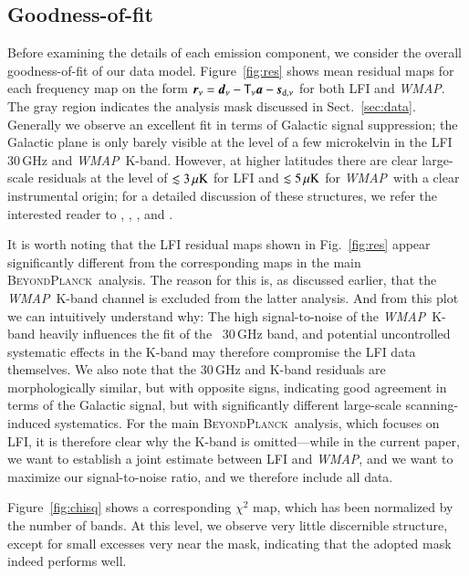\documentclass[twocolumn]{aa}
\def\WMAP{\textit{WMAP}}
\renewcommand{\d}[0]{\vec{d}}
\newcommand{\s}[0]{\vec{s}}
\renewcommand{\a}[0]{\vec{a}}
\newcommand{\T}[0]{\tens{T}}
\renewcommand{\r}[0]{\vec{r}}
\newcommand{\BP}{\textsc{BeyondPlanck}}
\begin{document}
\subsection{Goodness-of-fit}\label{subsub:goodness}



Before examining the details of each emission component, we consider
the overall goodness-of-fit of our data model. Figure~\ref{fig:res}
shows mean residual maps for each frequency map on the form $\r_{\nu}
= \d_{\nu} - \T_{\nu}\a - \s_{\mathrm{d},\nu}$ for both LFI and
\WMAP. The gray region indicates the analysis mask discussed in
Sect.~\ref{sec:data}. Generally we observe an excellent fit in terms
of Galactic signal suppression; the Galactic plane is only barely
visible at the level of a few microkelvin in the LFI 30\,GHz and
\WMAP\ K-band. However, at higher latitudes there are clear
large-scale residuals at the level of $\lesssim 3\,\mu {\rm K}$ for
LFI and $\lesssim 5\,\mu {\rm K}$ for \WMAP\ with a clear
instrumental origin; for a detailed discussion of these structures, we
refer the interested reader to \citet{jarosik2007}, \citet{bp01}, \citet{bp14}, and \citet{bp17}.

It is worth noting that the LFI residual maps shown in
Fig.~\ref{fig:res} appear significantly different from the
corresponding maps in the main \BP\ analysis. The reason for this is,
as discussed earlier, that the \WMAP\ K-band channel is excluded from
the latter analysis. And from this plot we can intuitively understand
why: The high signal-to-noise of the \WMAP\ K-band heavily influences
the fit of the \Planck\ 30\,GHz band, and potential uncontrolled
systematic effects in the K-band may therefore compromise the LFI data
themselves. We also note that the 30\,GHz and K-band residuals are
morphologically similar, but with opposite signs, indicating
good agreement in terms of the Galactic signal, but with significantly
different large-scale scanning-induced systematics. For the main \BP\ analysis, which focuses on
LFI, it is therefore clear why the K-band is omitted---while in the
current paper, we want to establish a joint estimate between LFI and
\WMAP, and we want to maximize our signal-to-noise ratio, and we
therefore include all data. 

Figure~\ref{fig:chisq} shows a corresponding $\chi^2$ map, which has been normalized by the number of bands. At this level, we observe very little discernible structure, except for small excesses very near the mask, indicating that the adopted mask indeed performs well.
\end{document}
